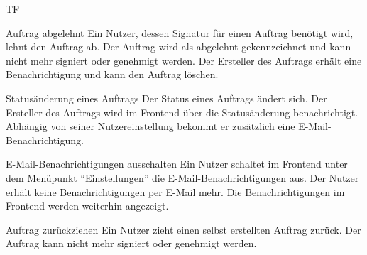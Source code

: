 \begin{Kriterien}{TF}
\newpage
    \item[Auftrag abgelehnt] Ein Nutzer, dessen Signatur für einen Auftrag benötigt wird, lehnt den Auftrag ab. \ergebnis Der Auftrag wird als abgelehnt gekennzeichnet und kann nicht mehr signiert oder genehmigt werden. Der Ersteller des Auftrags erhält eine Benachrichtigung und kann den Auftrag löschen.

 	\item[\gls{Status}änderung eines Auftrags] Der Status eines Auftrags ändert sich. \ergebnis Der Ersteller des Auftrags wird im Frontend über die Statusänderung benachrichtigt. Abhängig von seiner Nutzereinstellung bekommt er zusätzlich eine E-Mail-Benachrichtigung.

    \item[E-Mail-Benachrichtigungen ausschalten] Ein Nutzer schaltet im Frontend unter dem Menüpunkt \enquote{Einstellungen} die E-Mail-Benachrichtigungen aus. \ergebnis Der Nutzer erhält keine Benachrichtigungen per E-Mail mehr. Die Benachrichtigungen im Frontend werden weiterhin angezeigt.

	\item[Auftrag zurückziehen] Ein Nutzer zieht einen selbst erstellten Auftrag zurück. \ergebnis Der Auftrag kann nicht mehr signiert oder genehmigt werden.

\end{Kriterien}
